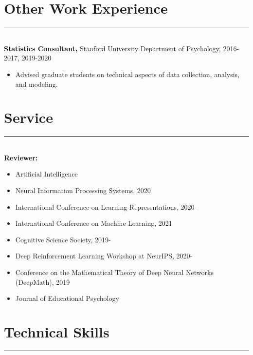 \documentclass[margin]{res}
\begin{document}
\begin{resume}
\vspace{1pt}\section{Other Work Experience} \vspace{-15pt} \rule{\textwidth}{0.5pt} \\[3pt]
{\bf Statistics Consultant,} Stanford University Department of Psychology, 2016-2017, 2019-2020
\begin{itemize} \itemsep -2pt
 \item Advised graduate students on technical aspects of data collection, analysis, and modeling. \end{itemize}
\vspace{1pt}\section{Service} \vspace{-15pt} \rule{\textwidth}{0.5pt} \\[3pt]
{\bf Reviewer:} 
\begin{itemize} \itemsep -2pt
 \item Artificial Intelligence
 \item Neural Information Processing Systems, 2020
 \item International Conference on Learning Representations, 2020- 
 \item International Conference on Machine Learning, 2021
 \item Cognitive Science Society, 2019-
 \item Deep Reinforcement Learning Workshop at NeurIPS, 2020-
 \item Conference on the Mathematical Theory of Deep Neural Networks (DeepMath), 2019
 \item Journal of Educational Psychology
 \end{itemize}
\vspace{1pt}\section{Technical Skills} \vspace{-15pt} \rule{\textwidth}{0.5pt} \\[3pt]

\end{resume}
\end{document}
